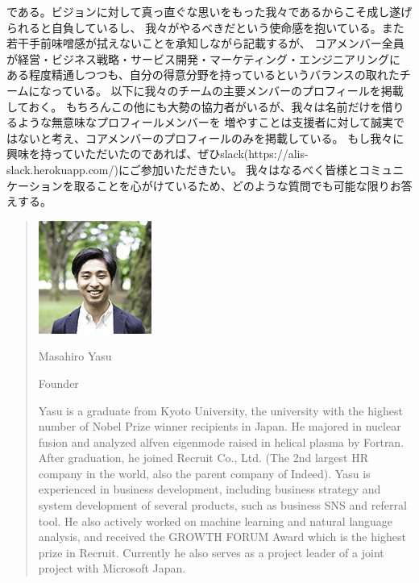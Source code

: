 \documentclass{jsarticle}
\begin{document}
である。ビジョンに対して真っ直ぐな思いをもった我々であるからこそ成し遂げられると自負しているし、
我々がやるべきだという使命感を抱いている。また若干手前味噌感が拭えないことを承知しながら記載するが、
コアメンバー全員が経営・ビジネス戦略・サービス開発・マーケティング・エンジニアリングに
ある程度精通しつつも、自分の得意分野を持っているというバランスの取れたチームになっている。
以下に我々のチームの主要メンバーのプロフィールを掲載しておく。
もちろんこの他にも大勢の協力者がいるが、我々は名前だけを借りるような無意味なプロフィールメンバーを
増やすことは支援者に対して誠実ではないと考え、コアメンバーのプロフィールのみを掲載している。
もし我々に興味を持っていただいたのであれば、ぜひslack(https://alis-slack.herokuapp.com/)にご参加いただきたい。
我々はなるべく皆様とコミュニケーションを取ることを心がけているため、どのような質問でも可能な限りお答えする。
\begin{quote}
	\includegraphics{img/yasu.jpg}
	
Masahiro Yasu

Founder

Yasu is a graduate from Kyoto University, the university with the highest
number of Nobel Prize winner recipients in Japan. He majored in nuclear fusion and 
analyzed alfven eigenmode raised in helical plasma by Fortran. After graduation, 
he joined Recruit Co., Ltd. (The 2nd largest HR company in the world, also 
the parent company of Indeed). Yasu is experienced in business development, 
including business strategy and system development of several products, 
such as business SNS and referral tool. He also actively worked on machine 
learning and natural language analysis, and received the GROWTH FORUM 
Award which is the highest prize in Recruit. Currently he also serves as a 
project leader of a joint project with Microsoft Japan.
\end{quote}
\end{document}
